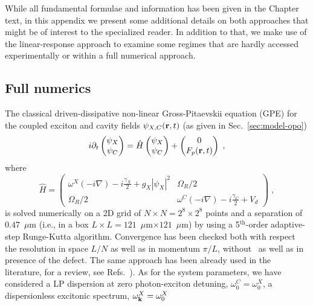 \begin{subappendices}
While all fundamental formulae and information has been given in the
Chapter text, in this appendix we present some additional details on
both approaches that might be of interest to the specialized reader.
In addition to that, we make use of the linear-response approach to
examine some regimes that are hardly accessed experimentally or within
a full numerical approach.


\subsection{Full numerics}
\label{subsec:detun}
The classical driven-dissipative non-linear Gross-Pitaevskii equation
(GPE) for the coupled exciton and cavity fields
$\psi_{X,C} (\mathbf{r},t)$ (as given in Sec.~\ref{sec:model-opo})
%
\begin{equation}
  i\partial_t \begin{pmatrix} \psi_X \\ \psi_C \end{pmatrix} =
  \hat{H} \begin{pmatrix} \psi_X \\ \psi_C \end{pmatrix}
  + \begin{pmatrix} 0 \\ F_p(\mathbf{r},t) \end{pmatrix}\; ,
\label{eq:numer}
\end{equation}
%
where
%
\begin{equation}
  \hat{H} = \begin{pmatrix} \omega^{X}(-i\nabla) - i
    \frac{\gamma_X}{2} + g_X |\psi_X|^2 & \Omega_R/2 \\ \Omega_R/2 &
    \omega^C(-i\nabla) - i \frac{\gamma_C}{2} + V_d \end{pmatrix} \;
  ,
\end{equation}
%
is solved numerically on a 2D grid of $N\times N=2^8\times 2^8$ points
and a separation of $0.47$~$\mu$m (i.e., in a box $L\times L =
121$~$\mu$m$\times 121$~$\mu$m) by using a 5$^{\text{th}}$-order
adaptive-step Runge-Kutta algorithm. Convergence has been checked both
with respect the resolution in space $L/N$ as well as in momentum
$\pi/L$, without~\cite{Marchetti_2010,9783642241857} as well as in
presence of the defect.
%
The same approach has been already used in the literature, for a
review, see Refs.~\cite{Marchetti_2010,9783642241857}).
%
As for the system parameters, we have considered a LP dispersion at
zero photon-exciton detuning, $\omega^C_0 = \omega^X_0$, a
dispersionless excitonic spectrum, $\omega^X_{\mathbf{k}} = \omega^X_0$

\end{subappendices}
